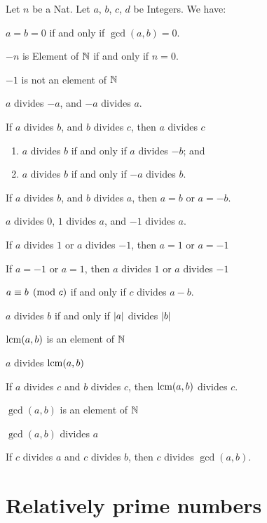 \documentclass{article}
\begin{document}
Let $n$ be a Nat. Let $a$, $b$, $c$, $d$ be Integers. We have:
\begin{thm}
\item\label{int2:5} $a=b=0$ if and only if $\gcd(a,b)=0$.
\item\label{int2:6} $-n$ is Element of $\mathbb{N}$ if and only if $n=0$.
\item\label{int2:7} $-1$ is not an element of $\mathbb{N}$
\item\label{int2:8} $a$ divides $-a$, and $-a$ divides $a$.
\item\label{int2:9} If $a$ divides $b$, and $b$ divides $c$, then $a$
  divides $c$
\item\label{int2:10} \begin{enumerate}[label=(\roman*)]
\item $a$ divides $b$ if and only if $a$ divides $-b$; and
\item $a$ divides $b$ if and only if $-a$ divides $b$.
\end{enumerate}
\item\label{int2:11} If $a$ divides $b$, and $b$ divides $a$, then $a=b$
  or $a=-b$.
\item\label{int2:12} $a$ divides $0$, $1$ divides $a$, and $-1$ divides $a$.
\item\label{int2:13} If $a$ divides $1$ or $a$ divides $-1$, then $a=1$
  or $a=-1$
\item\label{int2:14} If $a=-1$ or $a=1$, then $a$ divides $1$ or $a$
  divides $-1$
\item\label{int2:15} $a\equiv b\pmod{c}$ if and only if $c$ divides $a-b$.
\item\label{int2:16} $a$ divides $b$ if and only if $\lvert a\rvert$ divides $\lvert b\rvert$
\item\label{int2:17} $\operatorname{lcm}(a,b)$ is an element of $\mathbb{N}$
\item\label{int2:18} $a$ divides $\operatorname{lcm}(a,b)$
\item\label{int2:19} If $a$ divides $c$ and $b$ divides $c$, then
  $\operatorname{lcm}(a,b)$ divides $c$.
\item\label{int2:20} $\gcd(a,b)$ is an element of $\mathbb{N}$
\item\label{int2:21} $\gcd(a,b)$ divides $a$
\item\label{int2:22} If $c$ divides $a$ and $c$ divides $b$, then $c$
  divides $\gcd(a,b)$.
\end{thm}
\section{Relatively prime numbers}
\end{document}
